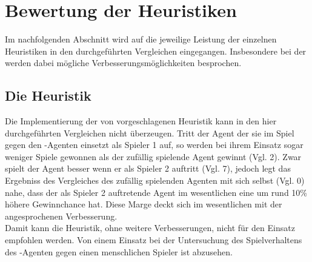 \section{Bewertung der Heuristiken}
\authormax
\label{sect:Fazit:Heuristiken}
Im nachfolgenden Abschnitt wird auf die jeweilige Leistung der einzelnen Heuristiken in den durchgeführten Vergleichen eingegangen. Insbesondere bei der  werden dabei mögliche Verbesserungsmöglichkeiten besprochen.  
\subsection{Die Heuristik }
Die Implementierung der von \cite{nijssen_2007} vorgeschlagenen Heuristik kann in den hier durchgeführten Vergleichen nicht überzeugen. Tritt der Agent der sie im Spiel gegen den -Agenten einsetzt als Spieler 1 auf, so werden bei ihrem Einsatz sogar weniger Spiele gewonnen als der zufällig spielende Agent gewinnt (Vgl. 2). Zwar spielt der Agent besser wenn er als Spieler 2 auftritt (Vgl. 7), jedoch legt das Ergebniss des Vergleiches des zufällig spielenden Agenten mit sich selbst (Vgl. 0) nahe, dass der als Spieler 2 auftretende Agent im wesentlichen eine um rund 10\% höhere Gewinnchance hat. Diese Marge deckt sich im wesentlichen mit der angesprochenen Verbesserung.
\\Damit kann die Heuristik, ohne weitere Verbesserungen, nicht für den Einsatz empfohlen werden. Von einem Einsatz bei der Untersuchung des Spielverhaltens des \mxZitat{\abp}-Agenten gegen einen menschlichen Spieler ist abzusehen. 
